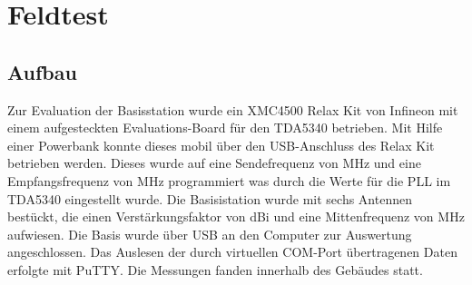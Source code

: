 \chapter{Feldtest}
\label{sec:Feldtest}
\pagestyle{scrheadings}
\section{Aufbau}
Zur Evaluation der Basisstation wurde ein  XMC4500 Relax Kit von Infineon mit einem aufgesteckten Evaluations-Board für den TDA5340 betrieben. Mit Hilfe einer Powerbank konnte dieses mobil über den \ac{USB}-Anschluss des Relax Kit betrieben werden.
Dieses wurde auf eine Sendefrequenz von \unit[868,0]{MHz} und eine Empfangsfrequenz von \unit[867,999]{MHz} programmiert was durch die Werte für die \ac{PLL} im TDA5340 eingestellt wurde. 
Die Basisistation wurde mit sechs Antennen bestückt, die einen Verstärkungsfaktor von \unit[3,6]{dBi} und eine Mittenfrequenz von \unit[868]{MHz} aufwiesen. Die Basis wurde über \ac{USB} an den Computer zur Auswertung angeschlossen. Das Auslesen der durch virtuellen COM-Port übertragenen Daten erfolgte mit  PuTTY. Die Messungen fanden innerhalb des Gebäudes statt.



